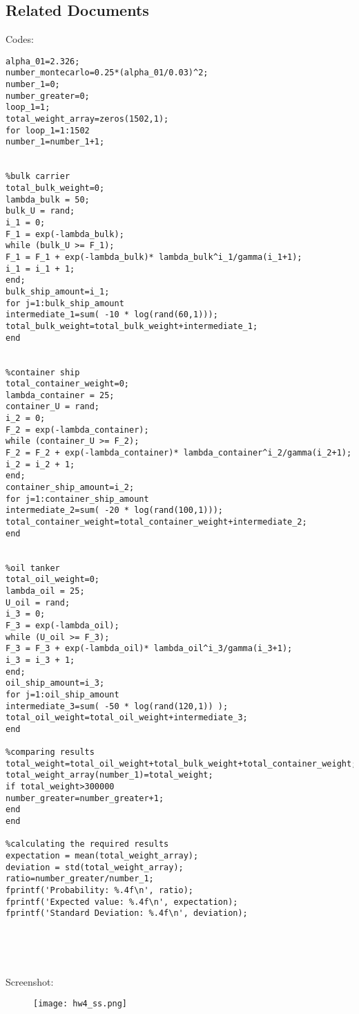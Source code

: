 \documentclass[12pt]{article}
\begin{document}
\subsection*{Related Documents} 
Codes:\\
\begin{lstlisting}[style=Matlab-editor]
%initial_data
alpha_01=2.326;
number_montecarlo=0.25*(alpha_01/0.03)^2;
number_1=0;
number_greater=0;
loop_1=1;
total_weight_array=zeros(1502,1);
for loop_1=1:1502
number_1=number_1+1;


%bulk carrier
total_bulk_weight=0;
lambda_bulk = 50; 
bulk_U = rand; 
i_1 = 0; 
F_1 = exp(-lambda_bulk); 
while (bulk_U >= F_1); 
F_1 = F_1 + exp(-lambda_bulk)* lambda_bulk^i_1/gamma(i_1+1);
i_1 = i_1 + 1;
end;
bulk_ship_amount=i_1;
for j=1:bulk_ship_amount
intermediate_1=sum( -10 * log(rand(60,1)));
total_bulk_weight=total_bulk_weight+intermediate_1;
end


%container ship
total_container_weight=0;
lambda_container = 25; 
container_U = rand; 
i_2 = 0; 
F_2 = exp(-lambda_container); 
while (container_U >= F_2); 
F_2 = F_2 + exp(-lambda_container)* lambda_container^i_2/gamma(i_2+1);
i_2 = i_2 + 1;
end;
container_ship_amount=i_2;
for j=1:container_ship_amount
intermediate_2=sum( -20 * log(rand(100,1)));
total_container_weight=total_container_weight+intermediate_2;
end


%oil tanker
total_oil_weight=0;
lambda_oil = 25; 
U_oil = rand; 
i_3 = 0; 
F_3 = exp(-lambda_oil); 
while (U_oil >= F_3); 
F_3 = F_3 + exp(-lambda_oil)* lambda_oil^i_3/gamma(i_3+1);
i_3 = i_3 + 1;
end;
oil_ship_amount=i_3;
for j=1:oil_ship_amount
intermediate_3=sum( -50 * log(rand(120,1)) );
total_oil_weight=total_oil_weight+intermediate_3;
end

%comparing results
total_weight=total_oil_weight+total_bulk_weight+total_container_weight;
total_weight_array(number_1)=total_weight;
if total_weight>300000
number_greater=number_greater+1;
end
end

%calculating the required results
expectation = mean(total_weight_array);
deviation = std(total_weight_array);
ratio=number_greater/number_1;
fprintf('Probability: %.4f\n', ratio);
fprintf('Expected value: %.4f\n', expectation);
fprintf('Standard Deviation: %.4f\n', deviation);





\end{lstlisting}
Screenshot:\\
\begin{figure}[H]
  \texttt{[image: hw4\_ss.png]}
  \centering
  \label{fig 2:Pdf with changing sigma values}
\end{figure}
\end{document}
